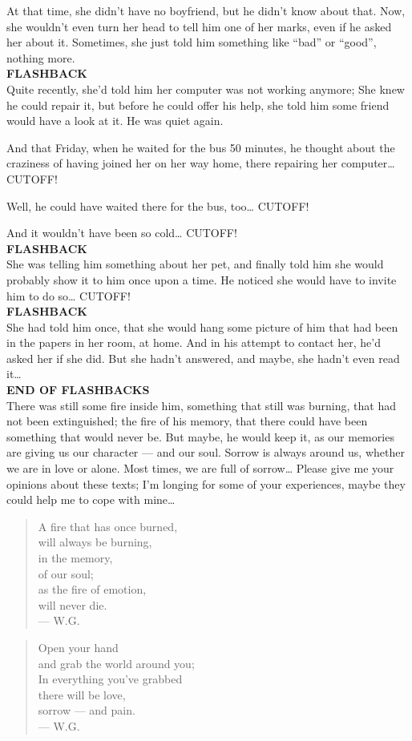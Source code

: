 At that time, she didn't have no boyfriend, but he didn't know about that. 
Now, she wouldn't even turn her head to tell him one of her marks, even if he asked her about it. 
Sometimes, she just told him something like \enquote{bad} or \enquote{good}, nothing more. \\
\textbf{FLASHBACK}\\
Quite recently, she'd told him her computer was not working anymore; She knew he could repair it, but before he could offer his help, she told him some friend would have a look at it. 
He was quiet again.

And that Friday, when he waited for the bus 50 minutes, he thought about the craziness of having joined her on her way home, there repairing her computer\dots{}
CUTOFF!

Well, he could have waited there for the bus, too\dots{}
CUTOFF!

And it wouldn't have been so cold\dots{}
CUTOFF!\\
\textbf{FLASHBACK}\\
She was telling him something about her pet, and finally told him she would probably show it to him once upon a time. 
He noticed she would have to invite him to do so\dots{}
CUTOFF!\\
\textbf{FLASHBACK}\\
She had told him once, that she would hang some picture of him that had been in the papers in her room, at home. 
And in his attempt to contact her, he'd asked her if she did. 
But she hadn't answered, and maybe, she hadn't even read it\dots{}\\
\textbf{END OF FLASHBACKS}\\
There was still some fire inside him, something that still was burning, that had not been extinguished; the fire of his memory, that there could have been something that would never be. 
But maybe, he would keep it, as our memories are giving us our character --- and our soul. 
Sorrow is always around us, whether we are in love or alone. 
Most times, we are full of sorrow\dots{}
Please give me your opinions about these texts; I'm longing for some of your experiences, maybe they could help me to cope with mine\dots{}

\begin{quote}
A fire that has once burned, \\
will always be burning, \\
in the memory, \\
of our soul; \\
as the fire of emotion, \\
will never die. \\
--- W.G.
\end{quote}

\begin{quote}
Open your hand \\
and grab the world around you; \\
In everything you've grabbed \\
there will be love, \\
sorrow --- and pain. \\
--- W.G.
\end{quote}
